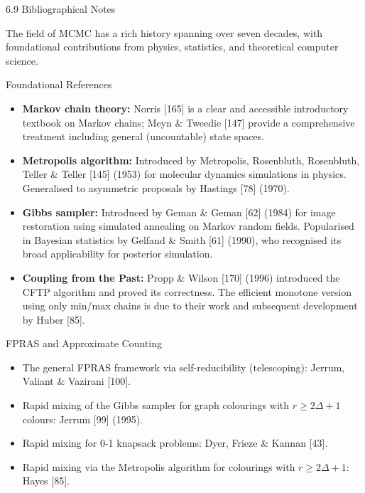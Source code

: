 \documentclass[aspectratio=169,10pt]{beamer}
\begin{document}
\begin{frame}[allowframebreaks]{6.9 Bibliographical Notes}

The field of MCMC has a rich history spanning over seven decades, with foundational contributions from physics, statistics, and theoretical computer science.

\begin{block}{Foundational References}
\begin{itemize}
  \item \textbf{Markov chain theory:} Norris [165] is a clear and accessible introductory textbook on Markov chains; Meyn \& Tweedie [147] provide a comprehensive treatment including general (uncountable) state spaces.
  \item \textbf{Metropolis algorithm:} Introduced by Metropolis, Rosenbluth, Rosenbluth, Teller \& Teller [145] (1953) for molecular dynamics simulations in physics. Generalised to asymmetric proposals by Hastings [78] (1970).
  \item \textbf{Gibbs sampler:} Introduced by Geman \& Geman [62] (1984) for image restoration using simulated annealing on Markov random fields. Popularised in Bayesian statistics by Gelfand \& Smith [61] (1990), who recognised its broad applicability for posterior simulation.
  \item \textbf{Coupling from the Past:} Propp \& Wilson [170] (1996) introduced the CFTP algorithm and proved its correctness. The efficient monotone version using only min/max chains is due to their work and subsequent development by Huber [85].
\end{itemize}
\end{block}

\begin{block}{FPRAS and Approximate Counting}
\begin{itemize}
  \item The general FPRAS framework via self-reducibility (telescoping): Jerrum, Valiant \& Vazirani [100].
  \item Rapid mixing of the Gibbs sampler for graph colourings with $r \ge 2\Delta+1$ colours: Jerrum [99] (1995).
  \item Rapid mixing for 0-1 knapsack problems: Dyer, Frieze \& Kannan [43].
  \item Rapid mixing via the Metropolis algorithm for colourings with $r \ge 2\Delta+1$: Hayes [85].
\end{itemize}
\end{block}


\end{frame}
\end{document}
